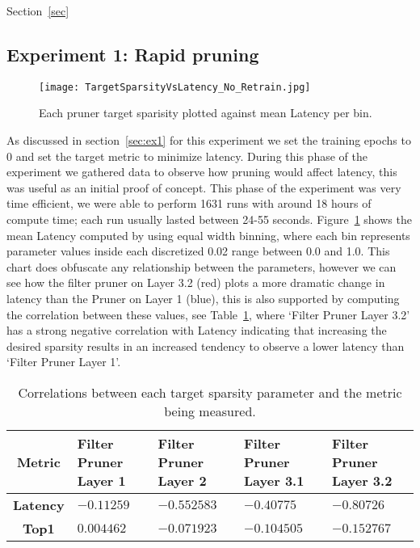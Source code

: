 \documentclass[../Dissertation.tex]{subfiles}
\begin{document}
Section~\ref{sec}

\subsection{Experiment 1: Rapid pruning}\label{sec:FastPruningPhase}

\begin{figure}[H]
    \texttt{[image: TargetSparsityVsLatency\_No\_Retrain.jpg]}
    \caption{Each pruner target sparisity plotted against mean Latency per bin.}
    \label{fig:fastPruneParamVSLatency}
\end{figure}

As discussed in section~\ref{sec:ex1} for this experiment we set the training epochs to 0 and set the target metric to minimize latency. 
During this phase of the experiment we gathered data to observe how pruning would affect latency, this was useful as an initial proof of concept.
This phase of the experiment was very time efficient, we were able to perform 1631 runs with around 18 hours of compute time; each run usually lasted between 24-55 seconds. 
Figure~\ref{fig:fastPruneParamVSLatency} shows the mean Latency computed by using equal width binning, where each bin represents parameter values inside each discretized 0.02 range between 0.0 and 1.0.
This chart does obfuscate any relationship between the parameters, however we can see how the filter pruner on Layer 3.2 (red) plots a more dramatic change in latency than the Pruner on Layer 1 (blue), this is also supported by computing the correlation between these values, see Table~\ref{tab:fastPruneCorrelations}, where `Filter Pruner Layer 3.2' has a strong negative correlation with Latency indicating that increasing the desired sparsity results in an increased tendency to observe a lower latency than `Filter Pruner Layer 1'.

\singlespacing
\begin{table}[H]
    \centering
    \begin{tabular}{@{}cp{26mm}p{26mm}p{26mm}p{26mm}@{}}
    \toprule
    \textbf{Metric}  & \textbf{Filter Pruner  Layer 1} & \textbf{Filter Pruner Layer 2} & \textbf{Filter Pruner Layer 3.1} & \textbf{Filter Pruner Layer 3.2} \\ \midrule
    \textbf{Latency} & $-0.11259$                        & $-0.552583$                      & $-0.40775$                         & $-0.80726$                         \\
    \textbf{Top1}    & $0.004462$                        & $-0.071923$                      & $-0.104505$                        & $-0.152767$                        \\ \bottomrule
    \end{tabular}
    \caption{Correlations between each target sparsity parameter and the metric being measured.}
    \label{tab:fastPruneCorrelations}
\end{table}
\doublespacing
\end{document}
